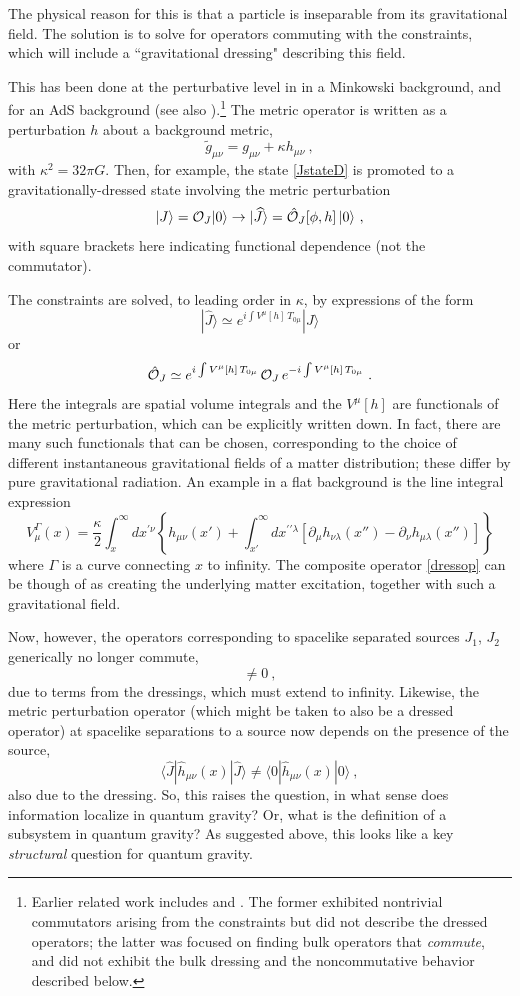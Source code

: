 \documentclass[11pt]{article}
\numberwithin{equation}{section}
\newcommand{\beq}{\begin{equation}}
\newcommand{\eeq}{\end{equation}}
\begin{document}
The physical reason for this is that a particle is inseparable from its gravitational field.  The solution is to solve for operators commuting with the constraints, which will include a ``gravitational dressing" describing this field.

This has been done at the perturbative level in \cite{DoGi1,DoGi4} in a Minkowski background, and \cite{GiKi} for an AdS background (see also \cite{CGPR}).\footnote{Earlier related work includes \cite{Heem} and  \cite{KaLigrav}.   The former exhibited nontrivial commutators arising from the constraints but did not describe the dressed operators; the latter was focused on finding bulk operators that {\it commute}, and did not exhibit  the bulk dressing and the noncommutative behavior described below.}  The metric operator is written as a perturbation $h$ about a background metric,
\beq
\tilde g_{\mu\nu} = g_{\mu\nu} + \kappa h_{\mu\nu}\ ,
\eeq
with $\kappa^2=32\pi G$.  Then, for example, the state \eqref{JstateD} is promoted to a gravitationally-dressed state involving the metric perturbation
\beq
|J\rangle= {\cal O}_J|0\rangle\rightarrow |\widehat J\rangle =\hat{\cal O}_J[\phi,h]\,|0\rangle\ ,
\eeq
with square brackets  here indicating functional dependence (not the commutator).

The constraints are solved, to leading order in $\kappa$, by expressions of the form
\beq
|\widehat J\rangle \simeq e^{i\int V^\mu[h]\,T_{0\mu}} |J\rangle
\eeq
or
\beq\label{dressop}
\hat {\cal O}_J \simeq e^{i\int V^\mu[h]\,T_{0\mu}}\, {\cal O}_J\, e^{-i\int V^\mu[h]\,T_{0\mu}}\ .
\eeq
Here the integrals are spatial volume integrals and
the  $V^\mu[h]$ are functionals of the metric perturbation, which can be explicitly written down.  In fact, there are many such functionals that can be chosen, corresponding to the choice of different instantaneous gravitational fields of a matter distribution; these differ by pure gravitational radiation.  An example in a flat background is the line integral expression \cite{DoGi1,QGQF}
\beq
 V_\mu^\Gamma(x)= \frac{\kappa}{2} \int_x^\infty dx^{\prime\nu} \left\{ h_{\mu\nu}(x') + \int_{x'}^\infty dx^{\prime\prime\lambda}\left[\partial_\mu h_{\nu\lambda}(x'') - \partial_\nu h_{\mu\lambda}(x'')\right]\right\}
\eeq
where $\Gamma$ is a curve connecting $x$ to infinity.
The composite operator \eqref{dressop} can be though of as creating the underlying matter excitation, together with such a gravitational field.

Now, however, the operators corresponding to spacelike separated sources $J_1$, $J_2$ generically no longer commute\cite{SGalg,DoGi1},
\beq
[\hat{\cal O}_{J_1}\,,\hat{\cal O}_{J_2}]\neq0\ ,
\eeq
due to terms from the dressings, which must extend to infinity\cite{DoGi2}.  Likewise, the metric perturbation operator (which might be taken to also be a dressed operator) at spacelike separations to a source   now depends on the presence of the source,
\beq
\langle\widehat J|\hat h_{\mu\nu}(x)|\widehat J\rangle \neq\langle 0|\hat h_{\mu\nu}(x)|0\rangle\ ,
\eeq
also due to the dressing.  So, this raises the question, in what sense does information localize in quantum gravity?  Or, what is the definition of a subsystem in quantum gravity?  As suggested above, this looks like a key {\it structural} question for quantum gravity.
\end{document}

